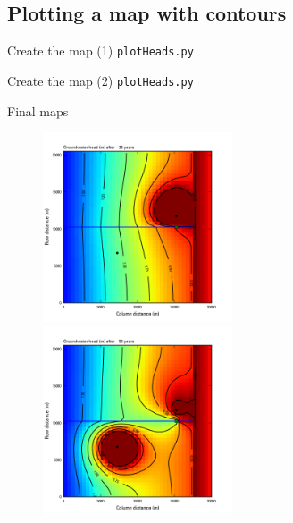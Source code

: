 \documentclass[t]{beamer}
\begin{document}
\subsection{Plotting a map with contours}
\begin{frame}{Create the map (1)}
	\small{\texttt{plotHeads.py}}
	\vspace{-15pt}\begin{figure}[ht]
		\centering
	        \lstset{numbers=left}
	       	
	       	
	\end{figure}
\end{frame}

\begin{frame}{Create the map (2)}
	\small{\texttt{plotHeads.py}}
	\vspace{-15pt}\begin{figure}[ht]
		\centering
	        \lstset{numbers=left}
	       	
	\end{figure}
\end{frame}

\begin{frame}{Final maps}
	\begin{figure}[ht]
		\centering
	       \includegraphics[width=0.5\textwidth]{figures/MF_Results_00024.png} 
	       \includegraphics[width=0.5\textwidth]{figures/MF_Results_00049.png}
	 \end{figure}
\end{frame}
\end{document}
